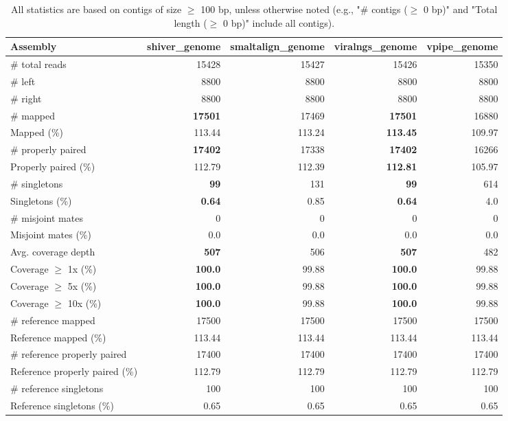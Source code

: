 \documentclass[12pt,a4paper]{article}
\begin{document}
\begin{table}[ht]
\begin{center}
\caption{All statistics are based on contigs of size $\geq$ 100 bp, unless otherwise noted (e.g., "\# contigs ($\geq$ 0 bp)" and "Total length ($\geq$ 0 bp)" include all contigs).}
\begin{tabular}{|l*{4}{|r}|}
\hline
Assembly & shiver\_genome & smaltalign\_genome & viralngs\_genome & vpipe\_genome \\ \hline
\# total reads & 15428 & 15427 & 15426 & 15350 \\ \hline
\# left & 8800 & 8800 & 8800 & 8800 \\ \hline
\# right & 8800 & 8800 & 8800 & 8800 \\ \hline
\# mapped & {\bf 17501} & 17469 & {\bf 17501} & 16880 \\ \hline
Mapped (\%) & 113.44 & 113.24 & {\bf 113.45} & 109.97 \\ \hline
\# properly paired & {\bf 17402} & 17338 & {\bf 17402} & 16266 \\ \hline
Properly paired (\%) & 112.79 & 112.39 & {\bf 112.81} & 105.97 \\ \hline
\# singletons & {\bf 99} & 131 & {\bf 99} & 614 \\ \hline
Singletons (\%) & {\bf 0.64} & 0.85 & {\bf 0.64} & 4.0 \\ \hline
\# misjoint mates & 0 & 0 & 0 & 0 \\ \hline
Misjoint mates (\%) & 0.0 & 0.0 & 0.0 & 0.0 \\ \hline
Avg. coverage depth & {\bf 507} & 506 & {\bf 507} & 482 \\ \hline
Coverage $\geq$ 1x (\%) & {\bf 100.0} & 99.88 & {\bf 100.0} & 99.88 \\ \hline
Coverage $\geq$ 5x (\%) & {\bf 100.0} & 99.88 & {\bf 100.0} & 99.88 \\ \hline
Coverage $\geq$ 10x (\%) & {\bf 100.0} & 99.88 & {\bf 100.0} & 99.88 \\ \hline
\# reference mapped & 17500 & 17500 & 17500 & 17500 \\ \hline
Reference mapped (\%) & 113.44 & 113.44 & 113.44 & 113.44 \\ \hline
\# reference properly paired & 17400 & 17400 & 17400 & 17400 \\ \hline
Reference properly paired (\%) & 112.79 & 112.79 & 112.79 & 112.79 \\ \hline
\# reference singletons & 100 & 100 & 100 & 100 \\ \hline
Reference singletons (\%) & 0.65 & 0.65 & 0.65 & 0.65 \\ \hline

\end{tabular}
\end{center}
\end{table}
\end{document}

